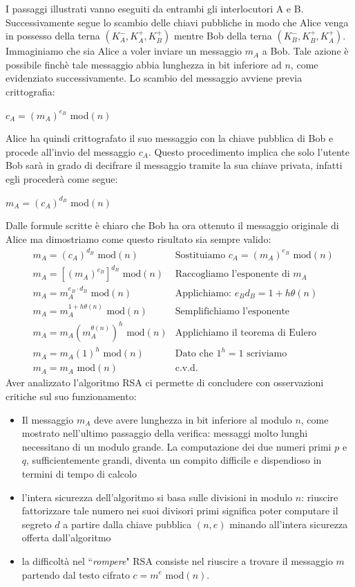 \documentclass[a4paper,12pt]{tesiinfo}
\begin{document}
I passaggi illustrati vanno eseguiti da entrambi gli interlocutori A e B. Successivamente segue lo scambio delle chiavi pubbliche in modo che Alice venga in possesso della terna $(K_A^-, K_A^+, K_B^+)$ mentre Bob della terna $(K_B^-, K_B^+, K_A^+)$. Immaginiamo che sia Alice a voler inviare un messaggio $m_A$ a Bob. Tale azione \`e possibile finch\`e tale messaggio abbia lunghezza in bit inferiore ad $n$, come evidenziato successivamente. Lo scambio del messaggio avviene previa crittografia:
\begin{center}
 $c_A = (m_A)^{e_B}$ mod$(n)$
\end{center}
Alice ha quindi crittografato il suo messaggio con la chiave pubblica di Bob e procede all'invio del messaggio $c_A$. Questo procedimento implica che solo l'utente Bob sar\`a in grado di decifrare il messaggio tramite la sua chiave privata, infatti egli proceder\`a come segue:
\begin{center}
 $m_A = (c_A)^{d_B}$ mod$(n)$
\end{center}
Dalle formule scritte \`e chiaro che Bob ha ora ottenuto il messaggio originale di Alice ma dimostriamo come questo risultato sia sempre valido:
\begin{align*}
  &m_A = (c_A)^{d_B} \text{ mod}(n) & \text{Sostituiamo $c_A = (m_A)^{e_B}$ mod$(n)$}\\
  &m_A = [(m_A)^{e_B}]^{d_B} \text{ mod}(n) & \text{Raccogliamo l'esponente di }m_A\\
  &m_A = m_A^{e_B \cdot d_B} \text{ mod}(n) & \text{Applichiamo: $e_Bd_B=1+h\theta(n)$}\\
  &m_A = m_A^{1+h\theta(n)} \text{ mod}(n) & \text{Semplifichiamo l'esponente}\\
  &m_A = m_A(m_A^{\theta(n)})^h \text{ mod}(n) & \text{Applichiamo il teorema di Eulero}\\
  &m_A = m_A(1)^h \text{ mod}(n) & \text{Dato che $1^h = 1$ scriviamo}\\
  &m_A = m_A \text{ mod}(n) & \text{c.v.d.}
\end{align*}
Aver analizzato l'algoritmo RSA ci permette di concludere con osservazioni critiche sul suo funzionamento:
\begin{itemize}
  \item Il messaggio $m_A$ deve avere lunghezza in bit inferiore al modulo $n$, come mostrato nell'ultimo passaggio della verifica: messaggi molto lunghi necessitano di un modulo grande. La computazione dei due numeri primi $p$ e $q$, sufficientemente grandi, diventa un compito difficile e dispendioso in termini di tempo di calcolo
  \item l'intera sicurezza dell'algoritmo si basa sulle divisioni in modulo $n$: riuscire fattorizzare tale numero nei suoi divisori primi significa poter computare il segreto $d$ a partire dalla chiave pubblica $(n, e)$ minando all'intera sicurezza offerta dall'algoritmo
  \item la difficolt\`a nel ``\textit{rompere}" RSA consiste nel riuscire a trovare il messaggio $m$ partendo dal testo cifrato $c = m^e$ mod$(n)$. 
\end{itemize}
%
%
%
%
%
%
%
%
%
%
%
%
\end{document}
